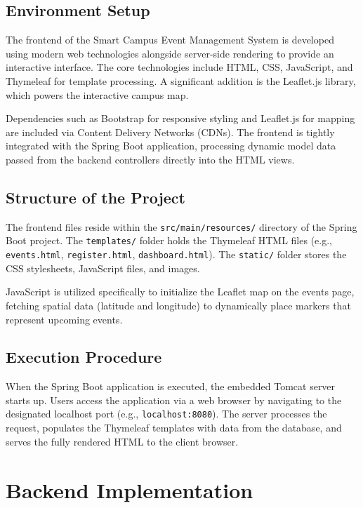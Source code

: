 \documentclass[10pt]{report}
\begin{document}
\subsection{Environment Setup}
The frontend of the Smart Campus Event Management System is developed using modern web technologies alongside server-side rendering to provide an interactive interface. The core technologies include HTML, CSS, JavaScript, and Thymeleaf for template processing. A significant addition is the Leaflet.js library, which powers the interactive campus map.

Dependencies such as Bootstrap for responsive styling and Leaflet.js for mapping are included via Content Delivery Networks (CDNs). The frontend is tightly integrated with the Spring Boot application, processing dynamic model data passed from the backend controllers directly into the HTML views.

\subsection{Structure of the Project}
The frontend files reside within the \texttt{src/main/resources/} directory of the Spring Boot project. The \texttt{templates/} folder holds the Thymeleaf HTML files (e.g., \texttt{events.html}, \texttt{register.html}, \texttt{dashboard.html}). The \texttt{static/} folder stores the CSS stylesheets, JavaScript files, and images. 

JavaScript is utilized specifically to initialize the Leaflet map on the events page, fetching spatial data (latitude and longitude) to dynamically place markers that represent upcoming events.

\subsection{Execution Procedure}
When the Spring Boot application is executed, the embedded Tomcat server starts up. Users access the application via a web browser by navigating to the designated localhost port (e.g., \texttt{localhost:8080}). The server processes the request, populates the Thymeleaf templates with data from the database, and serves the fully rendered HTML to the client browser. 


\section{Backend Implementation}
\end{document}
